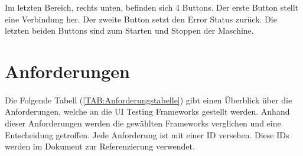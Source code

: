 		Im letzten Bereich, rechts unten, befinden sich 4 Buttons. Der erste Button stellt eine Verbindung her. Der zweite Button setzt den Error Status zurück. Die letzten beiden Buttons sind zum Starten und Stoppen der Maschine.
		 
		 \newpage
	\section{Anforderungen}
		\paragraph{} Die Folgende Tabell (\ref{TAB:Anforderungstabelle}) gibt einen Überblick über die Anforderungen, welche an die UI Testing Frameworks gestellt werden. Anhand dieser Anforderungen werden die gewählten Frameworks verglichen und eine Entscheidung getroffen. Jede Anforderung ist mit einer ID versehen. Diese IDs werden im Dokument zur Referenzierung verwendet.
					
